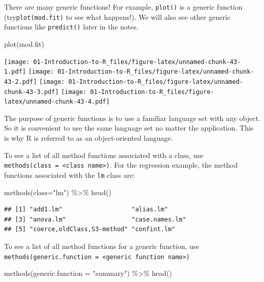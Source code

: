 \documentclass[
]{book}
\newenvironment{Shaded}{\begin{snugshade}}{\end{snugshade}}
\newcommand{\AttributeTok}[1]{\textcolor[rgb]{0.77,0.63,0.00}{#1}}
\newcommand{\FunctionTok}[1]{\textcolor[rgb]{0.00,0.00,0.00}{#1}}
\newcommand{\NormalTok}[1]{#1}
\newcommand{\SpecialCharTok}[1]{\textcolor[rgb]{0.00,0.00,0.00}{#1}}
\newcommand{\StringTok}[1]{\textcolor[rgb]{0.31,0.60,0.02}{#1}}
\theoremstyle{definition}
\theoremstyle{definition}
\theoremstyle{definition}
\theoremstyle{definition}
\theoremstyle{remark}
\begin{document}
There are many generic functions! For example, \texttt{plot()} is a generic function (try\texttt{plot(mod.fit)} to see what happens!). We will also see other generic functions like \texttt{predict()} later in the notes.

\begin{Shaded}
\begin{Highlighting}[]
\FunctionTok{plot}\NormalTok{(mod.fit)}
\end{Highlighting}
\end{Shaded}

\texttt{[image: 01-Introduction-to-R\_files/figure-latex/unnamed-chunk-43-1.pdf]} \texttt{[image: 01-Introduction-to-R\_files/figure-latex/unnamed-chunk-43-2.pdf]} \texttt{[image: 01-Introduction-to-R\_files/figure-latex/unnamed-chunk-43-3.pdf]} \texttt{[image: 01-Introduction-to-R\_files/figure-latex/unnamed-chunk-43-4.pdf]}

The purpose of generic functions is to use a familiar language set with any object. So it is convenient to use the same language set no matter the application. This is why R is referred to as an object-oriented language.

To see a list of all method functions associated with a class, use \texttt{methods(class\ =\ \textless{}class\ name\textgreater{})}. For the regression example, the method functions associated with the \texttt{lm} class are:

\begin{Shaded}
\begin{Highlighting}[]
\FunctionTok{methods}\NormalTok{(}\AttributeTok{class=}\StringTok{"lm"}\NormalTok{) }\SpecialCharTok{\%\textgreater{}\%} \FunctionTok{head}\NormalTok{()}
\end{Highlighting}
\end{Shaded}

\begin{verbatim}
## [1] "add1.lm"                   "alias.lm"                 
## [3] "anova.lm"                  "case.names.lm"            
## [5] "coerce,oldClass,S3-method" "confint.lm"
\end{verbatim}

To see a list of all method functions for a generic function, use \texttt{methods(generic.function\ =\ \textless{}generic\ function\ name\textgreater{})}

\begin{Shaded}
\begin{Highlighting}[]
\FunctionTok{methods}\NormalTok{(}\AttributeTok{generic.function =} \StringTok{"summary"}\NormalTok{) }\SpecialCharTok{\%\textgreater{}\%} \FunctionTok{head}\NormalTok{()}
\end{Highlighting}
\end{Shaded}
\end{document}
